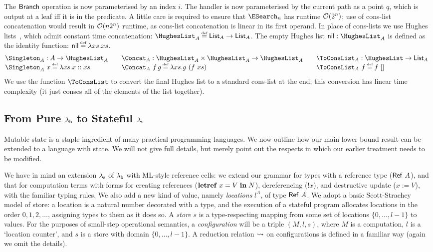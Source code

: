 \documentclass[12pt,phd,lfcs,twoside,openright,logo,leftchapter,normalheadings]{infthesis}
\theoremstyle{plain}
\theoremstyle{definition}
\begin{document}
%
The $\mathsf{Branch}$ operation is now parameterised by an index $i$.
%
The handler is now parameterised by the current path as a point $q$,
which is output at a leaf iff it is in the predicate.
%
A little care is required to ensure that $\ESearch_n$ has runtime
$\mathcal{O}(2^n)$; \naive use of cons-list concatenation would result in
$\mathcal{O}(n2^n)$ runtime, as cons-list concatenation is linear in its
first operand. In place of cons-lists we use Hughes
lists~\citep{Hughes86}, which admit constant time concatenation:
%
$\HughesList_A \defas \List_A \to \List_A$. The empty Hughes list
$\dec{nil} : \HughesList_A$ is defined as the identity function:
$\dec{nil} \defas \lambda xs. xs$.
%
{\small
  \[
  \ba{@{}l@{\qquad}l@{\qquad}l}
     \Singleton_A : A \to \HughesList_A
   & \Concat_A : \HughesList_A \times \HughesList_A \to \HughesList_A
   & \ToConsList_A : \HughesList \to \List_A\\
     \Singleton_A~x \defas \lambda xs. x \cons xs
   & \Concat_A~f\,g \defas \lambda xs. g~(f~xs)
   & \ToConsList_A~f \defas f~\nil
   \ea
\]}%
We use the function $\ToConsList$ to convert the final Hughes list to
a standard cons-list at the end; this conversion has linear time
complexity (it just conses all of the elements of the list together).


\subsection{From Pure $\lambda_{\mathsf{b}}$ to Stateful $\lambda_{\textrm{\normalfont s}}$}
\label{sec:mutable-state}

Mutable state is a staple ingredient of many practical programming
languages.  We now outline how our main lower bound result can be
extended to a language with state.  We will not give full details, but
merely point out the respects in which our earlier treatment needs to
be modified.

We have in mind an extension $\lambda_{\textrm{\normalfont s}}$ of $\lambda_{\mathsf{b}}$ with ML-style
reference cells: we extend our grammar for types with a reference type
($\mathsf{Ref}~A$), and that for computation terms with forms for creating
references ($\mathbf{letref}\; x = V\; \mathbf{in}\; N$), dereferencing ($!x$),
and destructive update ($x := V$), with the familiar typing rules.  We
also add a new kind of value, namely \emph{locations} $l^A$, of type
$\mathsf{Ref}~A$. We adopt a basic Scott-Strachey~\citeyearpar{ScottS71} model
of store: a location is a natural number decorated with a type, and
the execution of a stateful program allocates locations in the order
$0,1,2,\ldots$, assigning types to them as it does so. A \emph{store}
$s$ is a type-respecting mapping from some set of locations $\{
0,\ldots,l-1 \}$ to values.  For the purposes of small-step
operational semantics, a \emph{configuration} will be a triple
$(M,l,s)$, where $M$ is a computation, $l$ is a `location counter',
and $s$ is a store with domain $\{ 0,\ldots,l-1 \}$. A reduction
relation $\leadsto$ on configurations is defined in a familiar way
(again we omit the details).
\end{document}
